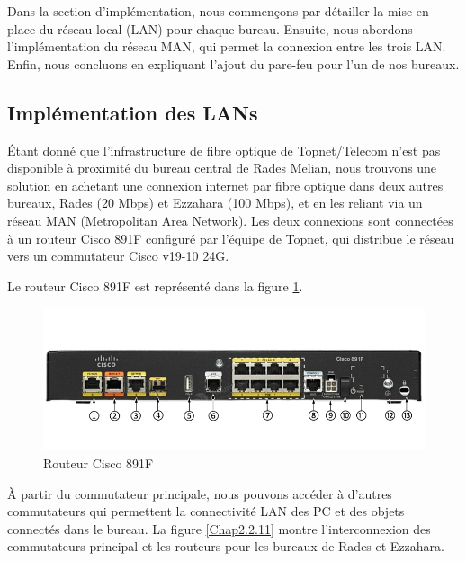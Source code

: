Dans la section d'implémentation, nous commençons par détailler la mise en place du réseau local (LAN) pour chaque bureau. Ensuite, nous abordons l'implémentation du réseau MAN, qui permet la connexion entre les trois LAN. Enfin, nous concluons en expliquant l'ajout du pare-feu pour l'un de nos bureaux.


\subsection{Implémentation des LANs}

Étant donné que l'infrastructure de fibre optique de Topnet/Telecom n'est pas disponible à proximité du bureau central de Rades Melian, nous trouvons une solution en achetant une connexion internet par fibre optique dans deux autres bureaux, Rades (20 Mbps) et Ezzahara (100 Mbps), et en les reliant via un réseau MAN (Metropolitan Area Network). Les deux connexions sont connectées à un routeur Cisco 891F configuré par l'équipe de Topnet, qui distribue le réseau vers un commutateur Cisco v19-10 24G. 


Le routeur Cisco 891F est représenté dans la figure \ref{Chap2.2.10}.

\begin{figure}[H]
\centering
\includegraphics[width=15cm]{Images/C891F_1.jpg}
\caption{Routeur Cisco 891F}
\label{Chap2.2.10}
\end{figure}

À partir du commutateur principale, nous pouvons accéder à d'autres commutateurs qui permettent la connectivité LAN des PC et des objets connectés dans le bureau. La figure \ref{Chap2.2.11} montre l'interconnexion des commutateurs principal et les routeurs pour les bureaux de Rades et Ezzahara.


